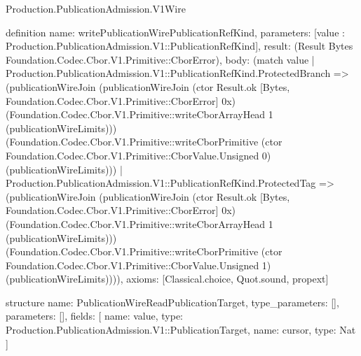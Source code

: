 \begin{lexlean}{Production.PublicationAdmission.V1Wire}
\begin{semanticmodule}
definition{
  name: writePublicationWirePublicationRefKind,
  parameters: [value : Production.PublicationAdmission.V1::PublicationRefKind],
  result: (Result Bytes Foundation.Codec.Cbor.V1.Primitive::CborError),
  body: (match value
    | Production.PublicationAdmission.V1::PublicationRefKind.ProtectedBranch => (publicationWireJoin (publicationWireJoin (ctor Result.ok [Bytes, Foundation.Codec.Cbor.V1.Primitive::CborError] 0x) (Foundation.Codec.Cbor.V1.Primitive::writeCborArrayHead 1 (publicationWireLimits))) (Foundation.Codec.Cbor.V1.Primitive::writeCborPrimitive (ctor Foundation.Codec.Cbor.V1.Primitive::CborValue.Unsigned 0) (publicationWireLimits)))
    | Production.PublicationAdmission.V1::PublicationRefKind.ProtectedTag => (publicationWireJoin (publicationWireJoin (ctor Result.ok [Bytes, Foundation.Codec.Cbor.V1.Primitive::CborError] 0x) (Foundation.Codec.Cbor.V1.Primitive::writeCborArrayHead 1 (publicationWireLimits))) (Foundation.Codec.Cbor.V1.Primitive::writeCborPrimitive (ctor Foundation.Codec.Cbor.V1.Primitive::CborValue.Unsigned 1) (publicationWireLimits)))),
  axioms: [Classical.choice, Quot.sound, propext]
}

structure{
  name: PublicationWireReadPublicationTarget,
  type_parameters: [],
  parameters: [],
  fields: [
    {name: value, type: Production.PublicationAdmission.V1::PublicationTarget},
    {name: cursor, type: Nat}
  ]
}


\end{semanticmodule}
\end{lexlean}
